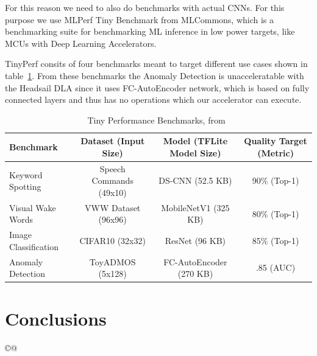 \documentclass[12pt,a4paper,english
]{tunithesis}
\begin{document}
For this reason we need to also do benchmarks with actual CNNs. For this purpose we use MLPerf Tiny Benchmark from MLCommons, which is a benchmarking suite for benchmarking ML inference in low power targets, like MCUs with Deep Learning Accelerators.~\parencite{tinyperf}

TinyPerf consits of four benchmarks meant to target different use cases shown in table~\ref{tab:tinyperf}. From these benchmarks the Anomaly Detection is unacceleratable with the Headsail DLA since it uses FC-AutoEncoder network, which is based on fully connected layers and thus has no operations which our accelerator can execute.

\begin{table}[ht]
\centering
\caption{Tiny Performance Benchmarks, from~\parencite{tinyperf}}
\begin{adjustbox}{max width=\textwidth}
\begin{tabular}{lccc}
    \toprule
    \textbf{Benchmark} & \textbf{Dataset (Input Size)} & \textbf{Model (TFLite Model Size)} & \textbf{Quality Target (Metric)} \\
    \midrule
    Keyword Spotting & Speech Commands (49x10) & DS-CNN (52.5 KB) & 90\% (Top-1) \\
    Visual Wake Words & VWW Dataset (96x96)  & MobileNetV1 (325 KB) & 80\% (Top-1) \\
    Image Classification & CIFAR10 (32x32) & ResNet (96 KB) & 85\% (Top-1) \\
    Anomaly Detection & ToyADMOS (5x128)  & FC-AutoEncoder (270 KB) & .85 (AUC) \\
    \bottomrule
\end{tabular}
\end{adjustbox}
\label{tab:tinyperf}
\end{table}

\chapter{Conclusions}
\label{ch:conclusions}©@
%
%
\newpage

\printbibliography[title=References]


%

\appendix
\pagestyle{headings}



%
% 
\def\appA{APPENDIX A. Something extra} %
\end{document}
